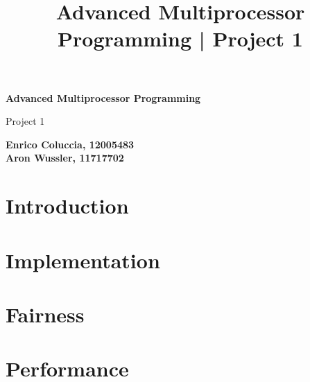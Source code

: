 \documentclass[12pt,a4paper, tikz]{article}
\begin{document}
\title{Advanced Multiprocessor Programming | Project 1}

\begin{titlepage}
    \begin{center}
        \vspace*{1cm}

        \Huge
        \textbf{Advanced Multiprocessor Programming}

        \vspace{0.5cm}
        \LARGE
        Project 1 \\

        \vspace{1.5cm}

        \small
        \textbf{Enrico Coluccia, 12005483\\ Aron Wussler, 11717702}

        \vfill

        \vspace{0.8cm}


    \end{center}
\end{titlepage}

\section{Introduction}


\section{Implementation}


\section{Fairness}


\section{Performance}


\printbibliography
\end{document}
